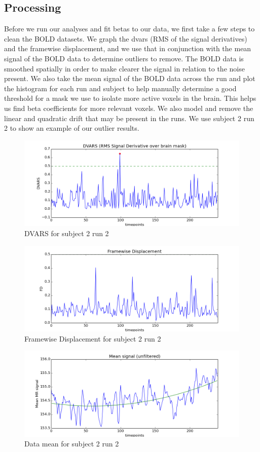 \subsection{Processing}
Before we run our analyses and fit betas to our data, we first take a few 
steps to clean the BOLD datasets. We graph the dvars (RMS of the signal 
derivatives) and the framewise displacement, and we use that in conjunction 
with the mean signal of the BOLD data to determine outliers to remove. The 
BOLD data is smoothed spatially in order to make clearer the signal in 
relation to the noise present. We also take the mean signal of the BOLD data 
across the run and plot the histogram for each run and subject to help 
manually determine a good threshold for a mask we use to isolate more active 
voxels in the brain. This helps us find beta coefficients for more relevant 
voxels. We also model and remove the linear and quadratic drift that may be 
present in the runs. 
We use subject 2 run 2 to show an example of our outlier results.

\begin{figure}[H]
    \centering
        \includegraphics[scale=0.5]{figures/dvars_sub2run2.png}
    \caption{DVARS for subject 2 run 2}
\end{figure}

\begin{figure}[H]
    \centering
        \includegraphics[scale=0.5]{figures/fd_sub2run2.png}
    \caption{Framewise Displacement for subject 2 run 2}
\end{figure}

\begin{figure}[H]
    \centering
        \includegraphics[scale=0.5]{figures/mean_sub2run2.png}
    \caption{Data mean for subject 2 run 2}
\end{figure}



